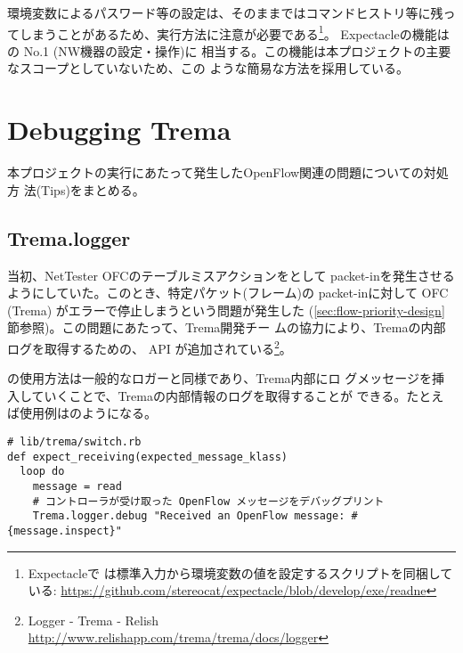 環境変数によるパスワード等の設定は、そのままではコマンドヒストリ等に残っ
てしまうことがあるため、実行方法に注意が必要である\footnote{Expectacleで
は標準入力から環境変数の値を設定するスクリプトを同梱している:
\url{https://github.com/stereocat/expectacle/blob/develop/exe/readne}}。
Expectacleの機能はの No.1 (NW機器の設定・操作)に
相当する。この機能は本プロジェクトの主要なスコープとしていないため、この
ような簡易な方法を採用している。

 \section{Debugging Trema}
 \label{sec:debugging-trema}

本プロジェクトの実行にあたって発生したOpenFlow関連の問題についての対処方
法(Tips)をまとめる。

  \subsection{Trema.logger}
  \label{sec:trema-logger}

当初、NetTester OFCのテーブルミスアクションをとして
packet-inを発生させるようにしていた。このとき、特定パケット(フレーム)の
packet-inに対して OFC (Trema) がエラーで停止しまうという問題が発生した
(\ref{sec:flow-priority-design}節参照)。この問題にあたって、Trema開発チー
ムの協力により、Tremaの内部ログを取得するための、 API
が追加されている\footnote{Logger - Trema - Relish
\url{http://www.relishapp.com/trema/trema/docs/logger}}。

の使用方法は一般的なロガーと同様であり、Trema内部にロ
グメッセージを挿入していくことで、Tremaの内部情報のログを取得することが
できる。たとえば使用例はのようになる。
\begin{lstlisting}[caption=\code{Trema.logger}使用例,label=lst:trema-logger-example]
# lib/trema/switch.rb
def expect_receiving(expected_message_klass)
  loop do
    message = read
    # コントローラが受け取った OpenFlow メッセージをデバッグプリント
    Trema.logger.debug "Received an OpenFlow message: #{message.inspect}"
\end{lstlisting}

